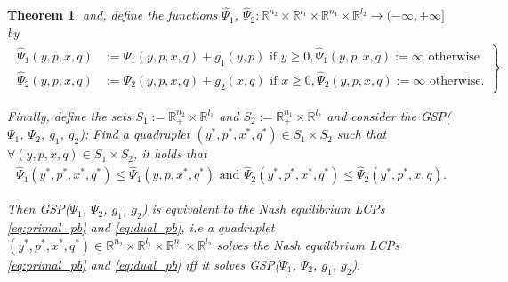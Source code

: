 \documentclass{article} %
\newtheorem{theorem}{Theorem} \newtheorem{lemma}[theorem]{Lemma}
\begin{document}
\begin{theorem}
and, define the functions $\hat{\Psi}_1$, $\hat{\Psi}_2:
\mathbb{R}^{n_2} \times \mathbb{R}^{l_1} \times \mathbb{R}^{n_1}
\times \mathbb{R}^{l_2} \rightarrow (-\infty, +\infty]$ by
\begin{eqnarray}
  \left.
  \begin{aligned}
    \hat{\Psi}_1(y, p, x, q) &:=
    \Psi_1(y, p, x, q)+ g_1(y, p) \text{ if }y \ge 0, \hat{\Psi}_1(y,
    p, x, q) := \infty \text{ otherwise}\\
    \hat{\Psi}_2(y, p, x, q) &:= \Psi_2(y, p, x, q)+ g_2(x, q) \text{ if
    }x \ge 0, \hat{\Psi}_2(y,p, x, q) := \infty \text{ otherwise}.
  \end{aligned}
  \right\}
\end{eqnarray}

Finally, define the sets $S_1 := \mathbb{R}^{n_2}_+ \times \mathbb{R}^{l_1}$ and $S_2 :=
\mathbb{R}^{n_1}_+ \times \mathbb{R}^{l_2}$ and consider the
GSP($\Psi_1$, $\Psi_2$, $g_1$, $g_2$): Find a quadruplet $(y^*,p^*, x^*, q^*) \in
S_1 \times S_2$ such that $\forall (y,p, x, q) \in S_1
    \times S_2$, it holds that
\begin{eqnarray}
    \hat{\Psi}_1(y^*, p^*, x^*, q^*) \le \hat{\Psi}_1(y, p, x^*,
    q^*) \text{ and }\hat{\Psi}_2(y^*, p^*, x^*, q^*)
    \le \hat{\Psi}_2(y^*, p^*, x, q).
  \label{eq:unconstrained_pb}
\end{eqnarray}
\label{thm:pd}

Then GSP($\Psi_1$,
  $\Psi_2$, $g_1$, $g_2$) is equivalent to the Nash equilibrium LCPs
  \eqref{eq:primal_pb} and \eqref{eq:dual_pb}, i.e
a quadruplet $(y^*,p^*, x^*, q^*) \in \mathbb{R}^{n_2}
  \times \mathbb{R}^{l_1} \times \mathbb{R}^{n_1} \times
  \mathbb{R}^{l_2}$ solves the Nash equilibrium LCPs
  \eqref{eq:primal_pb} and \eqref{eq:dual_pb} iff it solves
  GSP($\Psi_1$, $\Psi_2$, $g_1$, $g_2$). 
  \label{thm:pd}
\end{theorem}
\end{document}
